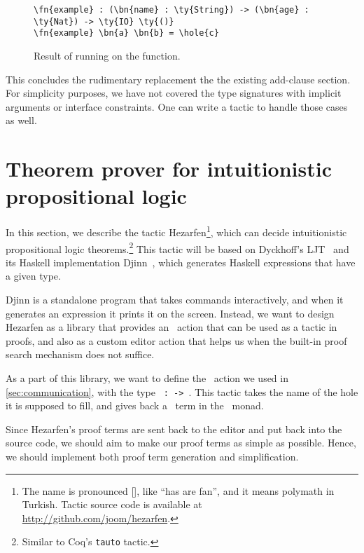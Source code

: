 \begin{figure}[ht]
\caption{Result of running  on the  function.}
\label{code:exampleAddClause2}
\begin{Verbatim}[framesep=2mm, label=\footnotesize{\normalfont{Idris}}, labelposition=topline]
\fn{example} : (\bn{name} : \ty{String}) -> (\bn{age} : \ty{Nat}) -> \ty{IO} \ty{()}
\fn{example} \bn{a} \bn{b} = \hole{c}
\end{Verbatim}
\end{figure}

This concludes the rudimentary replacement the the existing add-clause section.
For simplicity purposes, we have not covered the type signatures with implicit
arguments or interface constraints. One can write a tactic to handle
those cases as well.

\section{Theorem prover for intuitionistic propositional logic}\label{sec:hezarfen}

In this section, we describe the tactic Hezarfen\footnote{ The name is
  pronounced {[]}, like ``has are fan'', and it means
    polymath in Turkish.  Tactic source code is available at
    \url{http://github.com/joom/hezarfen}.}, which can decide intuitionistic
propositional logic theorems.\footnote{Similar to Coq's \texttt{tauto} tactic.}
This tactic will be based on Dyckhoff's LJT~\cite{ljt} and its Haskell
implementation Djinn~\cite{djinn}, which generates Haskell expressions
that have a given type.

Djinn is a standalone program that takes commands
interactively, and when it generates an expression it prints it on the screen.
Instead, we want to design Hezarfen as a library that provides an \Elab\ action
that can be used as a tactic in proofs, and also as a custom editor action that
helps us when the built-in proof search mechanism does not suffice.

As a part of this library, we want to define the \Elab\ action we used in
\autoref{sec:communication}, with the type
\texttt{ :  ->  }.
This tactic takes the name of the hole it is supposed to fill, and gives back a
\TT\ term in the \Elab\ monad.

Since Hezarfen's proof terms are sent back to the editor and put back into the
source code, we should aim to make our proof terms as simple as possible.
Hence, we should implement both proof term generation and simplification.


